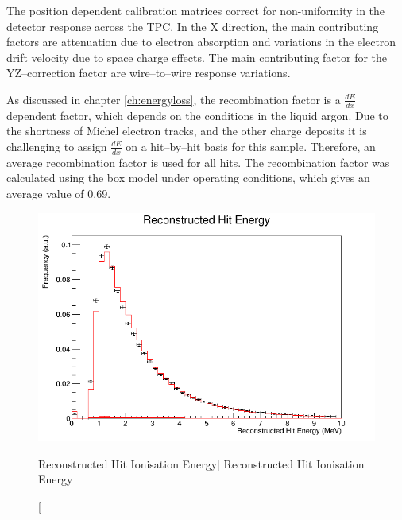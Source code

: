 The position dependent calibration matrices correct for non-uniformity in the
detector response across the TPC. In the X direction, the main contributing
factors are attenuation due to electron absorption and variations in the
electron drift velocity due to space charge effects. The main contributing
factor for the YZ--correction factor are wire--to--wire response variations.

As discussed in chapter \ref{ch:energyloss}, the recombination factor is a
$\frac{dE}{dx}$ dependent factor, which depends on the conditions in the liquid
argon. Due to the shortness of Michel electron tracks, and the other charge 
deposits it is challenging to assign $\frac{dE}{dx}$ on a hit--by--hit 
basis for this sample. Therefore, an average recombination factor is used for 
all hits. The recombination factor was calculated using the box model 
\cite{Acciarri2013a} under \protodune{} operating conditions, which gives an
average value of 0.69.

\begin{figure}
	\centering
	\includegraphics[width=\textwidth]{figures/hit_ion_reco.png}
	\caption
	[Reconstructed Hit Ionisation Energy]
	{Reconstructed Hit Ionisation Energy}
	\label{fig:hit_ion_reco}
\end{figure}

